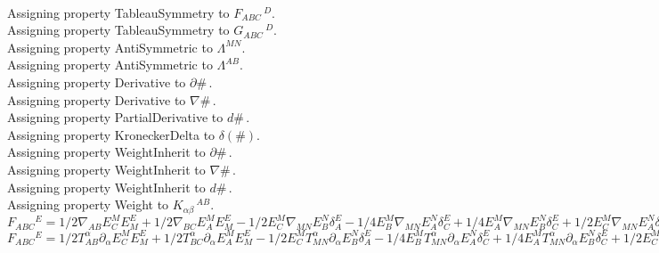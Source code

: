 \documentclass[11pt]{article}
\begin{document}
\\
Assigning property TableauSymmetry to ${F}_{A B C}\,^{D}$.
\\
Assigning property TableauSymmetry to ${G}_{A B C}\,^{D}$.
\\
Assigning property AntiSymmetric to ${\Lambda}^{M N}$.
\\
Assigning property AntiSymmetric to ${\Lambda}^{A B}$.
\\
Assigning property Derivative to $\partial{\#}\, $.
\\
Assigning property Derivative to $\nabla{\#}\, $.
\\
Assigning property PartialDerivative to $d{\#}\, $.
\\
Assigning property KroneckerDelta to $\delta(\#)$.
\\
Assigning property WeightInherit to $\partial{\#}\, $.
\\
Assigning property WeightInherit to $\nabla{\#}\, $.
\\
Assigning property WeightInherit to $d{\#}\, $.
\\
Assigning property Weight to ${K}_{\alpha \beta}\,^{A B}$.
\\
$F_{A B C}{}^{E} = 1/2 \nabla_{A B}{E_{C}^{M}} E^{E}_{M} + 1/2 \nabla_{B C}{E_{A}^{M}} E^{E}_{M} - 1/2 E_{C}^{M} \nabla_{M N}{E_{B}^{N}} \delta_{A}^{E} - 1/4 E_{B}^{M} \nabla_{M N}{E_{A}^{N}} \delta_{C}^{E} + 1/4 E_{A}^{M} \nabla_{M N}{E_{B}^{N}} \delta_{C}^{E} + 1/2 E_{C}^{M} \nabla_{M N}{E_{A}^{N}} \delta_{B}^{E} - 1/2 \nabla_{A C}{E_{B}^{M}} E^{E}_{M}$\\
$F_{A B C}{}^{E} = 1/2 T^{\alpha}_{A B} \partial_{\alpha}{E_{C}^{M}} E^{E}_{M} + 1/2 T^{\alpha}_{B C} \partial_{\alpha}{E_{A}^{M}} E^{E}_{M} - 1/2 E_{C}^{M} T^{\alpha}_{M N} \partial_{\alpha}{E_{B}^{N}} \delta_{A}^{E} - 1/4 E_{B}^{M} T^{\alpha}_{M N} \partial_{\alpha}{E_{A}^{N}} \delta_{C}^{E} + 1/4 E_{A}^{M} T^{\alpha}_{M N} \partial_{\alpha}{E_{B}^{N}} \delta_{C}^{E} + 1/2 E_{C}^{M} T^{\alpha}_{M N} \partial_{\alpha}{E_{A}^{N}} \delta_{B}^{E} - 1/2 T^{\alpha}_{A C} \partial_{\alpha}{E_{B}^{M}} E^{E}_{M}$
\end{document}
